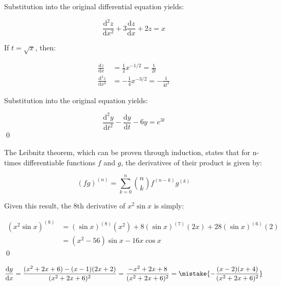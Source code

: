 \documentclass[12pt]{article}
\begin{document}
Substitution into the original differential equation yields:

\begin{equation}
    \frac{\mathrm{d}^{2}z}{\mathrm{d}x^{2}} + 3\frac{\mathrm{d}z}{\mathrm{d}x} + 2z = x
\end{equation}

If $t = \sqrt{x}$, then:

\begin{equation}
    \begin{split}
        \frac{\mathrm{d}z}{\mathrm{d}x} &= \frac{1}{2} x^{-1/2} = \frac{1}{2t} \\
        \frac{\mathrm{d}^{2}z}{\mathrm{d}x^{2}} &= -\frac{1}{4} x^{-3/2} = -\frac{1}{4t^{3}}
    \end{split}
\end{equation}

Substitution into the original equation yields:

\begin{equation}
    \frac{\mathrm{d}^{2}y}{\mathrm{d}t^{2}} - \frac{\mathrm{d}y}{\mathrm{d}t} - 6y = e^{3t}
\end{equation}
\qed


The Leibnitz theorem, which can be proven through induction, states that for n-times differentiable functions $f$ and $g$, the derivatives of their product is given by:

\begin{equation}
    (fg)^{(n)} = \sum_{k = 0}^{n} \binom{n}{k} f^{(n-k)} g^{(k)}
\end{equation}

Given this result, the 8th derivative of $x^{2} \sin{x}$ is simply:

\begin{equation}
    \begin{split}
        \left( x^{2} \sin{x} \right)^{(8)} &= (\sin{x})^{(8)} (x^{2}) + 8 (\sin{x})^{(7)} (2x) + 28 (\sin{x})^{(6)} (2) \\
        &= \left( x^{2} - 56 \right) \sin{x} - 16x \cos{x}
    \end{split}
\end{equation}
\qed




\begin{equation}
    \frac{\mathrm{d}y}{\mathrm{d}x} = \frac{(x^{2} + 2x + 6) - (x - 1)(2x + 2)}{(x^{2} + 2x + 6)^{2}} = \frac{-x^{2} + 2x + 8}{(x^{2} + 2x + 6)^{2}} = \mistake{- \frac{(x - 2)(x + 4)}{(x^{2} + 2x + 6)^{2}}}
\end{equation}
\end{document}
